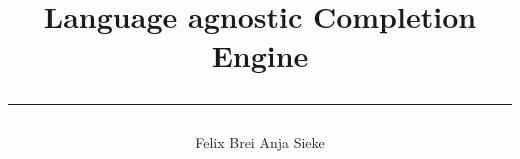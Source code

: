 \title{Language agnostic Completion Engine \rule{\linewidth}{1pt}}

\author{Felix Brei \hspace{3cm} Anja Sieke}
